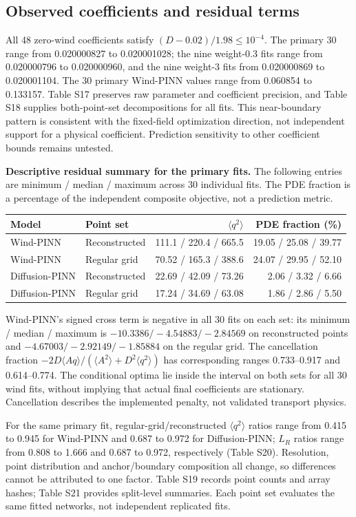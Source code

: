 \documentclass[11pt,a4paper]{article}
\begin{document}
\subsection*{Observed coefficients and residual terms}
All 48 zero-wind coefficients satisfy $(D-0.02)/1.98\leq10^{-4}$. The primary 30 range from 0.020000827 to 0.020001028; the nine weight-0.3 fits range from 0.020000796 to 0.020000960, and the nine weight-3 fits from 0.020000869 to 0.020001104. The 30 primary Wind-PINN values range from 0.060854 to 0.133157. Table S17 preserves raw parameter and coefficient precision, and Table S18 supplies both-point-set decompositions for all fits. This near-boundary pattern is consistent with the fixed-field optimization direction, not independent support for a physical coefficient. Prediction sensitivity to other coefficient bounds remains untested.

\textbf{Descriptive residual summary for the primary fits.} The following entries are minimum / median / maximum across 30 individual fits. The PDE fraction is a percentage of the independent composite objective, not a prediction metric.
\begin{center}\small
\begin{tabular}{llrr}
\toprule
Model & Point set & $\langle q^2\rangle$ & PDE fraction (\%)\\
\midrule
Wind-PINN & Reconstructed & 111.1 / 220.4 / 665.5 & 19.05 / 25.08 / 39.77\\
Wind-PINN & Regular grid & 70.52 / 165.3 / 388.6 & 24.07 / 29.95 / 52.10\\
Diffusion-PINN & Reconstructed & 22.69 / 42.09 / 73.26 & 2.06 / 3.32 / 6.66\\
Diffusion-PINN & Regular grid & 17.24 / 34.69 / 63.08 & 1.86 / 2.86 / 5.50\\
\bottomrule
\end{tabular}\end{center}
Wind-PINN's signed cross term is negative in all 30 fits on each set: its minimum / median / maximum is $-10.3386/-4.54883/-2.84569$ on reconstructed points and $-4.67003/-2.92149/-1.85884$ on the regular grid. The cancellation fraction $-2D\langle Aq\rangle/(\langle A^2\rangle+D^2\langle q^2\rangle)$ has corresponding ranges 0.733--0.917 and 0.614--0.774. The conditional optima lie inside the interval on both sets for all 30 wind fits, without implying that actual final coefficients are stationary. Cancellation describes the implemented penalty, not validated transport physics.

For the same primary fit, regular-grid/reconstructed $\langle q^2\rangle$ ratios range from 0.415 to 0.945 for Wind-PINN and 0.687 to 0.972 for Diffusion-PINN; $L_R$ ratios range from 0.808 to 1.666 and 0.687 to 0.972, respectively (Table S20). Resolution, point distribution and anchor/boundary composition all change, so differences cannot be attributed to one factor. Table S19 records point counts and array hashes; Table S21 provides split-level summaries. Each point set evaluates the same fitted networks, not independent replicated fits.
\end{document}

